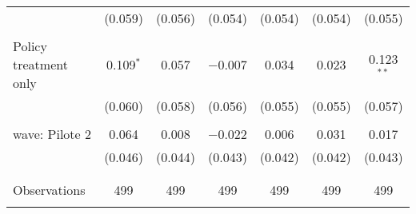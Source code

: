 \begin{tabular}{@{\extracolsep{5pt}}lcccccc}
  & (0.059) & (0.056) & (0.054) & (0.054) & (0.054) & (0.055) \\ 
  & & & & & & \\ 
 Policy treatment only & 0.109$^{*}$ & 0.057 & $-$0.007 & 0.034 & 0.023 & 0.123$^{**}$ \\ 
  & (0.060) & (0.058) & (0.056) & (0.055) & (0.055) & (0.057) \\ 
  & & & & & & \\ 
 wave: Pilote 2 & 0.064 & 0.008 & $-$0.022 & 0.006 & 0.031 & 0.017 \\ 
  & (0.046) & (0.044) & (0.043) & (0.042) & (0.042) & (0.043) \\ 
  & & & & & & \\ 
\hline \\[-1.8ex] 

Observations & 499 & 499 & 499 & 499 & 499 & 499 \\ 
\hline 
\hline \\[-1.8ex] 
\end{tabular} 